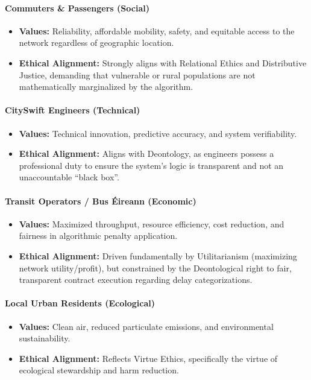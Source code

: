 \documentclass[]
{UCD_CS_41820_Report}
\begin{document}
\paragraph{Commuters \& Passengers (Social)}
\begin{itemize}
  \item \textbf{Values:} Reliability, affordable mobility, safety, and equitable access to the network regardless of geographic location.
  \item \textbf{Ethical Alignment:} Strongly aligns with Relational Ethics and Distributive Justice, demanding that vulnerable or rural populations are not mathematically marginalized by the algorithm.
\end{itemize}

\paragraph{CitySwift Engineers (Technical)}
\begin{itemize}
  \item \textbf{Values:} Technical innovation, predictive accuracy, and system verifiability.
  \item \textbf{Ethical Alignment:} Aligns with Deontology, as engineers possess a professional duty to ensure the system’s logic is transparent and not an unaccountable ``black box''.
\end{itemize}

\paragraph{Transit Operators / Bus Éireann (Economic)}
\begin{itemize}
  \item \textbf{Values:} Maximized throughput, resource efficiency, cost reduction, and fairness in algorithmic penalty application.
  \item \textbf{Ethical Alignment:} Driven fundamentally by Utilitarianism (maximizing network utility/profit), but constrained by the Deontological right to fair, transparent contract execution regarding delay categorizations.
\end{itemize}

\paragraph{Local Urban Residents (Ecological)}
\begin{itemize}
  \item \textbf{Values:} Clean air, reduced particulate emissions, and environmental sustainability.
  \item \textbf{Ethical Alignment:} Reflects Virtue Ethics, specifically the virtue of ecological stewardship and harm reduction.
\end{itemize}
\end{document}
